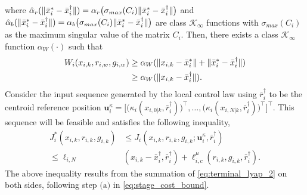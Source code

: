where $\hat{\alpha}_r(\lVert\bar{x}_i^* - \bar{x}_i^\dagger\rVert) = \alpha_r\bigl(\sigma_{max}(C_i)\lVert\bar{x}_i^* - \bar{x}_i^\dagger\rVert\bigr)$ and $\hat{\alpha}_b(\lVert\bar{x}_i^* - \bar{x}_i^\dagger\rVert) = \alpha_b\bigl(\sigma_{max}(C_i)\lVert\bar{x}_i^* - \bar{x}_i^\dagger\rVert\bigr)$ are class $\mathcal{K}_\infty$ functions with $\sigma_{max}(C_i)$ as the maximum singular value of the matrix $C_i$. Then, there exists a class $\mathcal{K}_\infty$ function $\alpha_W(\cdot)$ such that 
\begin{align}
    W_i(x_{i,k}, r_{i,w}, g_{i,w}) &\geq \alpha_W(\lVert x_{i,k} - \bar{x}_i^*\rVert + \lVert\bar{x}_i^* - \bar{x}_i^\dagger\rVert)\nonumber\\
    &\geq \alpha_W(\lVert x_{i,k} - \bar{x}_i^\dagger\rVert).
\end{align}
Consider the input sequence generated by the local control law using $\bar{r}_i^\dagger$ to be the centroid reference position $\mathbf{u}^\kappa_{i} = \big[\bigl(\kappa_i(x_{i,0|k},\bar{r}_i^\dagger)\bigr)^\top, \dots, \bigl(\kappa_i(x_{i,N|k},\bar{r}_i^\dagger)\bigr)^\top\big]^\top$. This sequence will be feasible and satisfies the following inequality,
\begin{align}
    J_i^*(x_{i,k}, r_{i,k}, g_{i,k}) &\leq J_i(x_{i,k}, r_{i,k}, g_{i,k}; \mathbf{u}^\kappa_i, \bar{r}_i^\dagger)\nonumber\\
    \leq \ell_{i,N}&(x_{i,k} - \bar{x}_i^\dagger, \bar{r}_i^\dagger) + \ell_{i,c}^\mu(r_{i,k},g_{i,k},\bar{r}_i^\dagger).
\end{align}
The above inequality results from the summation of \eqref{eq:terminal_lyap_2} on both sides, following step $\text{(a)}$ in \eqref{eq:stage_cost_bound}.

